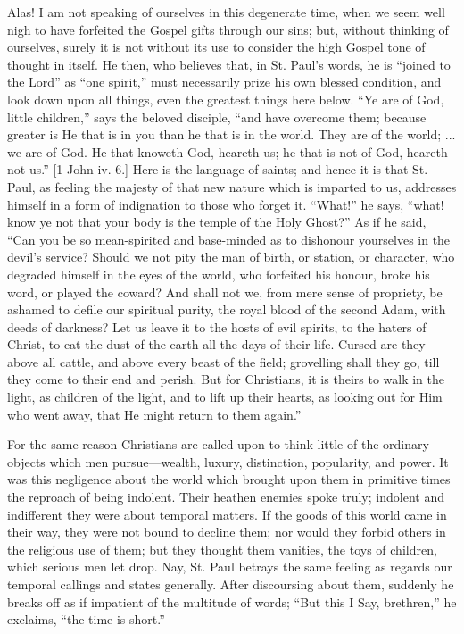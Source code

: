 Alas! I am not speaking of ourselves in this degenerate time, when
we seem well nigh to have forfeited the Gospel gifts through our sins;
but, without thinking of ourselves, surely it is not without its use
to consider the high Gospel tone of thought in itself. He then, who
believes that, in St. Paul's words, he is ``joined to the
Lord'' as ``one spirit,'' must necessarily prize his own
blessed condition, and look down upon all things, even the greatest
things here below. ``Ye are of God, little children,'' says
the beloved disciple, ``and have overcome them; because greater is
He that is in you than he that is in the world. They are of the world;
... we are of God. He that knoweth God, heareth us; he that is not of
God, heareth not us.'' [1 John iv. 6.] Here is the language of
saints; and hence it is that St. Paul, as feeling the majesty of that
new nature which is imparted to us, addresses himself in a form of
indignation to those who forget it. ``What!'' he says,
``what! know ye not that your body is the temple of the Holy
Ghost?'' As if he said, ``Can you be so mean-spirited and
base-minded as to dishonour yourselves in the devil's service? Should
we not pity the man of birth, or station, or character, who degraded
himself in the eyes of the world, who forfeited his honour, broke his
word, or played the coward? And shall not we, from mere sense of
propriety, be ashamed to defile our spiritual purity, the royal blood
of the second Adam, with deeds of darkness? Let us leave it to the
hosts of evil spirits, to the haters of Christ, to eat the dust of the
earth all the days of their life. Cursed are they above all cattle,
and above every beast of the field; grovelling shall they go, till
they come to their end and perish. But for Christians, it is theirs to
walk in the light, as children of the light, and to lift up their
hearts, as looking out for Him who went away, that He might return to
them again.''

For the same reason Christians are called upon to think little of
the ordinary objects which men pursue—wealth, luxury, distinction,
popularity, and power. It was this negligence about the world which
brought upon them in primitive times the reproach of being indolent.
Their heathen enemies spoke truly; indolent and indifferent they were
about temporal matters. If the goods of this world came in their way,
they were not bound to decline them; nor would they forbid others in
the religious use of them; but they thought them vanities, the toys of
children, which serious men let drop. Nay, St. Paul betrays the same
feeling as regards our temporal callings and states generally. After
discoursing about them, suddenly he breaks off as if impatient of the
multitude of words; ``But this I Say, brethren,'' he exclaims,
``the time is short.''

